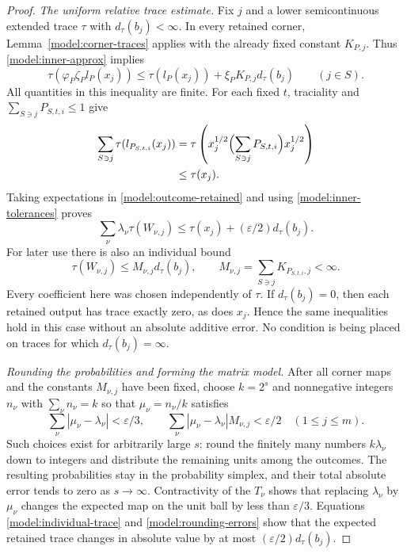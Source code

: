 \begin{proof}
\emph{The uniform relative trace estimate.}
Fix $j$ and a lower semicontinuous extended trace $\tau$ with
$d_\tau(b_j)<\infty$.  In every retained corner,
Lemma~\ref{model:corner-traces} applies with the already fixed
constant $K_{P,j}$.  Thus \eqref{model:inner-approx} implies
\[
 \tau(\varphi_P\zeta_Pl_P(x_j))
    \leq\tau(l_P(x_j))+\xi_PK_{P,j}d_\tau(b_j)
    \qquad(j\in S).
\]
All quantities in this inequality are finite.  For each fixed
$t$, traciality and $\sum_{S\ni j}P_{S,t,i}\leq1$ give
\begin{align*}
 \sum_{S\ni j}\tau(l_{P_{S,t,i}}(x_j))
 &=\tau\left(x_j^{1/2}
       \Bigl(\sum_{S\ni j}P_{S,t,i}\Bigr)x_j^{1/2}\right)\\
 &\leq\tau(x_j).
\end{align*}
Taking expectations in \eqref{model:outcome-retained} and using
\eqref{model:inner-tolerances} proves
\begin{equation}
 \label{model:expected-trace}
 \sum_\nu\lambda_\nu\tau(W_{\nu,j})
    \leq\tau(x_j)+(\varepsilon/2)d_\tau(b_j).
\end{equation}
For later use there is also an individual bound
\begin{equation}
 \label{model:individual-trace}
 \tau(W_{\nu,j})\leq M_{\nu,j}d_\tau(b_j),
 \qquad M_{\nu,j}=\sum_{S\ni j}K_{P_{S,t,i},j}<\infty.
\end{equation}
Every coefficient here was chosen independently of $\tau$.
If $d_\tau(b_j)=0$, then each retained output has trace exactly
zero, as does $x_j$.  Hence the same inequalities hold in this
case without an absolute additive error.  No condition is being
placed on traces for which $d_\tau(b_j)=\infty$.

\emph{Rounding the probabilities and forming the matrix model.}
After all corner maps and the constants $M_{\nu,j}$ have been
fixed, choose $k=2^s$ and nonnegative integers $n_\nu$ with
$\sum_\nu n_\nu=k$ so that
$\mu_\nu=n_\nu/k$ satisfies
\begin{equation}
 \label{model:rounding-errors}
 \sum_\nu|\mu_\nu-\lambda_\nu|<\varepsilon/3,
 \qquad
 \sum_\nu|\mu_\nu-\lambda_\nu|M_{\nu,j}
      <\varepsilon/2\quad(1\leq j\leq m).
\end{equation}
Such choices exist for arbitrarily large $s$: round the finitely
many numbers $k\lambda_\nu$ down to integers and distribute
the remaining units among the outcomes.  The resulting
probabilities stay in the probability simplex, and their total
absolute error tends to zero as $s\to\infty$.  Contractivity of
the $T_\nu$ shows that replacing $\lambda_\nu$ by
$\mu_\nu$ changes the expected map on the unit ball by less
than $\varepsilon/3$.  Equations
\eqref{model:individual-trace} and \eqref{model:rounding-errors}
show that the expected retained trace changes in absolute value
by at most $(\varepsilon/2)d_\tau(b_j)$.


\end{proof}
